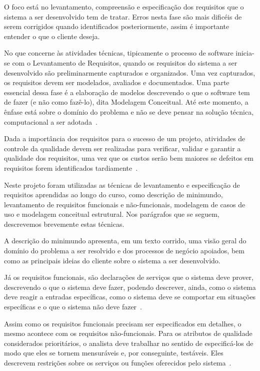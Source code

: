 O foco está no levantamento, compreensão e especificação dos requisitos que o sistema a ser desenvolvido tem de tratar.  Erros nesta fase são mais dificéis de serem corrigidos quando identificados posteriormente, assim é importante entender o que o cliente deseja.%

No que concerne às atividades técnicas, tipicamente o processo de software inicia-se com o Levantamento de Requisitos, quando os requisitos do sistema a ser desenvolvido são preliminarmente capturados e organizados. Uma vez capturados, os requisitos devem ser modelados, avaliados e documentados. Uma parte essencial dessa fase é a elaboração de modelos descrevendo o que o software tem de fazer (e não como fazê-lo), dita Modelagem Conceitual. Até este momento, a ênfase está sobre o domínio do problema e não se deve pensar na solução técnica, computacional a ser adotada~\cite{falboEngReq}.

Dada a importância dos requisitos para o sucesso de um projeto, atividades de controle da qualidade devem ser realizadas para verificar, validar e garantir a qualidade dos requisitos, uma vez que os custos serão bem maiores se defeitos em requisitos forem identificados tardiamente~\cite{falboEngReq}.

Neste projeto foram utilizadas as técnicas de levantamento e especificação de requisitos aprendidas ao longo do curso, como descrição de minimundo, levantamento de requisitos funcionais e não-funcionais, modelagem de casos de uso e modelagem conceitual estrutural. Nos parágrafos que se seguem, descrevemos brevemente estas técnicas.

A descrição do minimundo apresenta, em um texto corrido, uma visão geral do domínio do problema a ser resolvido e dos processos de negócio apoiados, bem como as principais ideias do cliente sobre o sistema a ser desenvolvido.

Já os requisitos funcionais, são declarações de serviços que o sistema deve prover, descrevendo o que o sistema deve fazer, podendo descrever, ainda, como o sistema deve reagir a entradas específicas, como o sistema deve se comportar em situações específicas e o que o sistema não deve fazer~\cite{sommerville}.

Assim como os requisitos funcionais precisam ser especificados em detalhes, o mesmo acontece com os requisitos não-funcionais. Para os atributos de qualidade considerados prioritários, o analista deve trabalhar no sentido de especificá-los de modo que eles se tornem mensuráveis e, por conseguinte, testáveis. Eles descrevem restrições sobre os serviços ou funções oferecidos pelo sistema~\cite{sommerville}.

